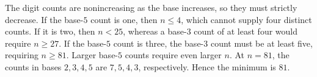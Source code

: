 The digit counts are nonincreasing as the base increases, so they must strictly decrease. If the base-$5$ count is one, then $n\le4$, which cannot supply four distinct counts. If it is two, then $n<25$, whereas a base-$3$ count of at least four would require $n\ge27$. If the base-$5$ count is three, the base-$3$ count must be at least five, requiring $n\ge81$. Larger base-$5$ counts require even larger $n$. At $n=81$, the counts in bases $2,3,4,5$ are $7,5,4,3$, respectively. Hence the minimum is $\boxed{81}$.
